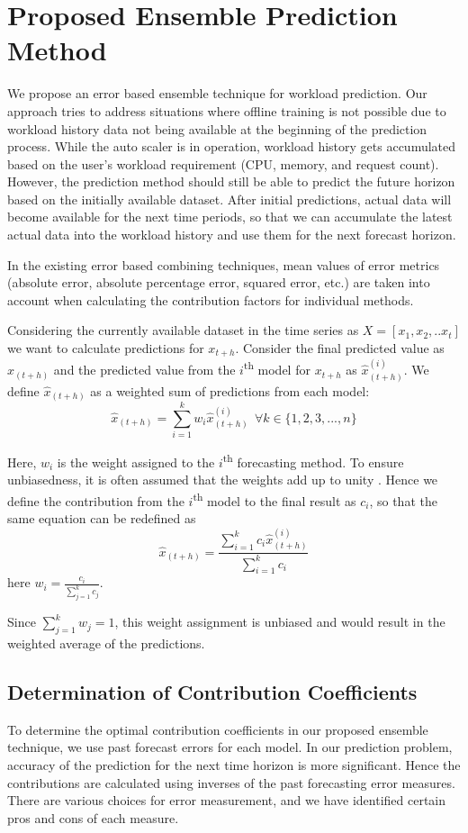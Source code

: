 \section{Proposed Ensemble Prediction Method}

We propose an error based ensemble technique for workload prediction. Our approach tries to address situations where offline training is not possible due to workload history data not being available at the beginning of the prediction process. While the auto scaler is in operation, workload history gets accumulated based on the user's workload requirement (CPU, memory, and request count). However, the prediction method should still be able to predict the future horizon based on the initially available dataset. After initial predictions, actual data will become available for the next time periods, so that we can accumulate the latest actual data into the workload history and use them for the next forecast horizon.

In the existing error based combining techniques, mean values of error metrics (absolute error, absolute percentage error, squared error, etc.) are taken into account when calculating the contribution factors for individual methods. 

Considering the currently available dataset in the time series as
$X=[x_{1},x_{2},.. x_{t}]$
we want to calculate predictions for $x_{t+h}$. Consider the final predicted value as $\hat{x}_{(t+h)}$ and the predicted value from the $i$\textsuperscript{th} model for $x_{t+h}$ as $\hat{x}_{(t+h)}^{(i)}$. We define $\hat{x}_{(t+h)}$ as a weighted sum of predictions from each model:
$$\hat{x}_{(t+h)}= \sum_{i=1}^{k}w_i \hat{x}_{(t+h)}^{(i)} \ \ \forall k \in \{1,2,3,...,n\}$$

Here, $w_i$ is the weight assigned to the $i$\textsuperscript{th} forecasting method. To ensure unbiasedness, it is often assumed that the weights add up to unity \cite{Adhikari_2012}. Hence we define the contribution from the $i$\textsuperscript{th} model to the final result as $c_i$, so that the same equation can be redefined as  
$$\hat{x}_{(t+h)}= \frac{\sum_{i=1}^{k}c_i \hat{x}_{(t+h)}^{(i)}}{\sum_{i=1}^{k}c_i}$$
here $w_{i}= \frac{c_{i}}{\sum_{j=1}^{k}c_j}$.

Since $\sum_{j=1}^{k}w_{j}=1$, this weight assignment is unbiased and would result in the weighted average of the predictions.

\subsection{Determination of Contribution Coefficients}
To determine the optimal contribution coefficients in our proposed ensemble technique, we use past forecast errors for each model. In our prediction problem, accuracy of the prediction for the next time horizon is more significant. Hence the contributions are calculated using inverses of the past forecasting error measures. There are various choices for error measurement, and we have identified certain pros and cons of each measure.

